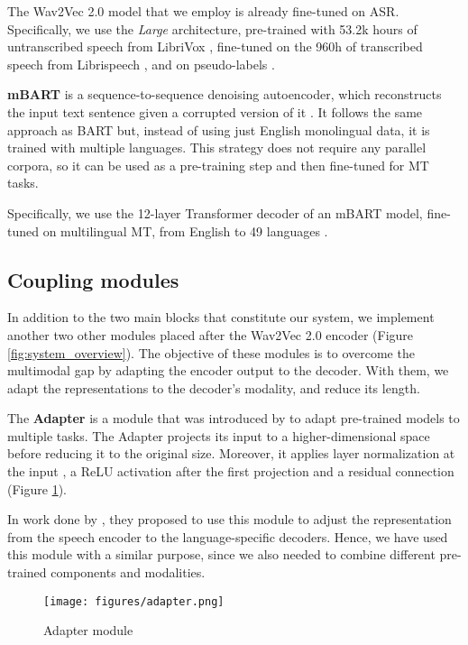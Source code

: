 \documentclass[11pt,a4paper]{article}
\begin{document}
        The Wav2Vec 2.0 model that we employ is already fine-tuned on ASR. Specifically, we use the \textit{Large} architecture, pre-trained with 53.2k hours of untranscribed speech from LibriVox \cite{librilight}, fine-tuned on the 960h of transcribed speech from Librispeech \cite{librispeech}, and on pseudo-labels \cite{wav2vec-selftraining}.
        
        \textbf{mBART} is a sequence-to-sequence denoising autoencoder, which reconstructs the input text sentence given a corrupted version of it \cite{mBART}. It follows the same approach as BART \cite{BART} but, instead of using just English monolingual data, it is trained with multiple languages. This strategy does not require any parallel corpora, so it can be used as a pre-training step and then fine-tuned for MT tasks.

        Specifically, we use the 12-layer Transformer decoder of an mBART model, fine-tuned on multilingual MT, from English to 49 languages \cite{mBART50}.
    
    \subsection{Coupling modules} \label{sec:adapteors}
        In addition to the two main blocks that constitute our system, we implement another two other modules placed after the Wav2Vec 2.0 encoder (Figure \ref{fig:system_overview}). The objective of these modules is to overcome the multimodal gap by adapting the encoder output to the decoder. With them, we adapt the representations to the decoder's modality, and reduce its length.
        
        The \textbf{Adapter} is a module that was introduced by \citet{adapter} to adapt pre-trained models to multiple tasks. The Adapter projects its input to a higher-dimensional space before reducing it to the original size. Moreover, it applies layer normalization at the input \cite{layernorm}, a ReLU activation after the first projection and a residual connection (Figure \ref{fig:adapter}).

        In work done by \citet{adapter-st}, they proposed to use this module to adjust the representation from the speech encoder to the language-specific decoders. Hence, we have used this module with a similar purpose, since we also needed to combine different pre-trained components and modalities.
                
        \begin{figure}[t]
          \centering
          \texttt{[image: figures/adapter.png]}
          \caption{Adapter module}
          \label{fig:adapter}
        \end{figure}
        
\end{document}
